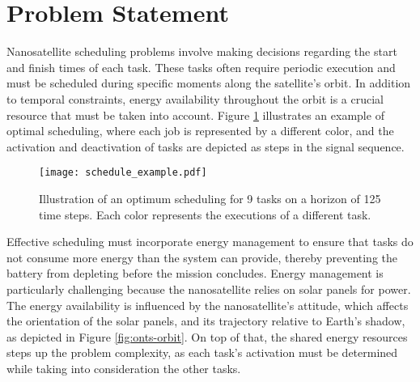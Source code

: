% 


\section{Problem Statement}

Nanosatellite scheduling problems involve making decisions regarding the start and finish times of each task.
These tasks often require periodic execution and must be scheduled during specific moments along the satellite's orbit.
In addition to temporal constraints, energy availability throughout the orbit is a crucial resource that must be taken into account.
Figure \ref{fig:example-scheduling} illustrates an example of optimal scheduling, where each job is represented by a different color, and the activation and deactivation of tasks are depicted as steps in the signal sequence.

\begin{figure}[h]
    \centering
    \texttt{[image: schedule\_example.pdf]}
    \caption{Illustration of an optimum scheduling for 9 tasks on a horizon of 125 time steps. Each color represents the executions of a different task.}
    \label{fig:example-scheduling}
\end{figure}

Effective scheduling must incorporate energy management to ensure that tasks do not consume more energy than the system can provide, thereby preventing the battery from depleting before the mission concludes.
Energy management is particularly challenging because the nanosatellite relies on solar panels for power.
The energy availability is influenced by the nanosatellite's attitude, which affects the orientation of the solar panels, and its trajectory relative to Earth's shadow, as depicted in Figure \ref{fig:onts-orbit}.
On top of that, the shared energy resources steps up the problem complexity, as each task's activation must be determined while taking into consideration the other tasks.

